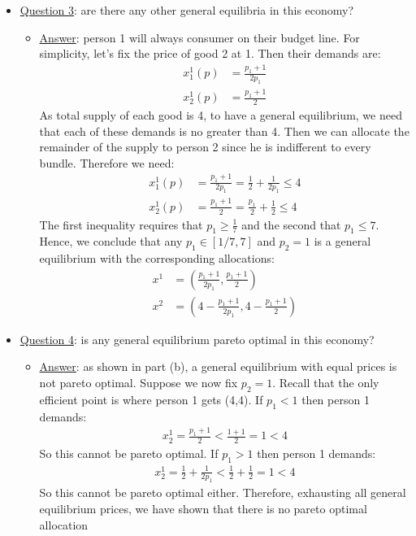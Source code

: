 \documentclass{article}
\begin{document}
  \begin{itemize}
    \item  \underline{Question 3}: are there any other general equilibria in this economy?
    \begin{itemize}
      \item  \underline{Answer}: person 1 will always consumer on their budget line. For simplicity, let's fix the price of good 2 at 1. Then their demands are:
      \begin{align*}
        x_{1}^{1}(p) &= \frac{p_{1} + 1}{2p_{1}} \\
        x_{2}^{1}(p) &= \frac{p_{1} + 1}{2}
      \end{align*}
      As total supply of each good is 4, to have a general equilibrium, we need that each of these demands is no greater than 4. Then we can allocate the remainder of the supply to person 2 since he is indifferent to every bundle. Therefore we need:
      \begin{align*}
        x_{1}^{1}(p) &= \frac{p_{1} + 1}{2p_{1}} = \frac{1}{2} + \frac{1}{2p_{1}} \leq 4 \\
        x_{2}^{1}(p) &= \frac{p_{1} + 1}{2} = \frac{p_{1}}{2} + \frac{1}{2} \leq 4
      \end{align*}
      The first inequality requires that $p_{1} \geq \tfrac{1}{7}$ and the second that $p_{1} \leq 7$. Hence, we conclude that any $p_{1} \in [1/7, 7]$ and $p_{2} = 1$ is a general equilibrium with the corresponding allocations:
      \begin{align*}
        x^{1} &= (\frac{p_{1} + 1}{2p_{1}}, \frac{p_{1} + 1}{2}) \\
        x^{2} &= (4 - \frac{p_{1} + 1}{2p_{1}}, 4 - \frac{p_{1} + 1}{2})
      \end{align*}
    \end{itemize}
  \end{itemize}
  \begin{itemize}
    \item  \underline{Question 4}: is any general equilibrium pareto optimal in this economy?
    \begin{itemize}
      \item  \underline{Answer}: as shown in part (b), a general equilibrium with equal prices is not pareto optimal. Suppose we now fix $p_{2} = 1$. Recall that the only efficient point is where person 1 gets (4,4). If $p_{1} < 1$ then person 1 demands:
      \begin{gather*}
        x_{2}^{1} = \frac{p_{1} + 1}{2} < \frac{1 + 1}{2} = 1 < 4
      \end{gather*}
      So this cannot be pareto optimal. If $p_{1} > 1$ then person 1 demands:
      \begin{gather*}
        x_{2}^{1} = \frac{1}{2} + \frac{1}{2p_{1}} < \frac{1}{2} + \frac{1}{2} = 1 < 4
      \end{gather*}
      So this cannot be pareto optimal either. Therefore, exhausting all general equilibrium prices, we have shown that there is no pareto optimal allocation
    \end{itemize}
  \end{itemize}
\end{document}

